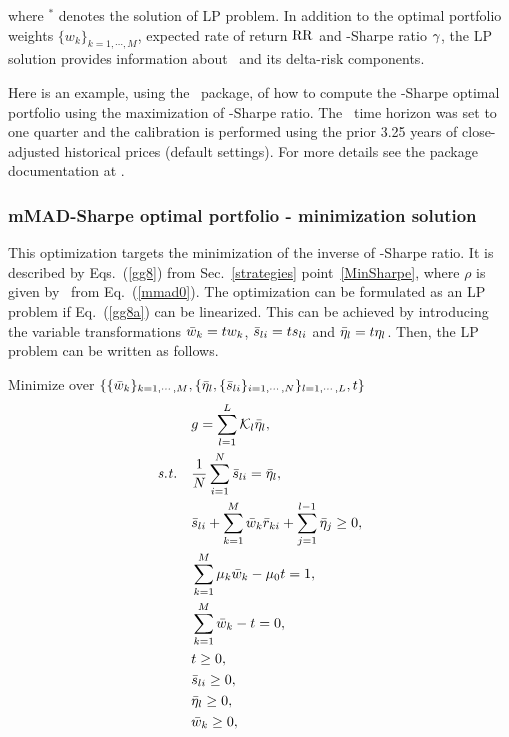 \noindent where $^*$ denotes the solution of LP problem.
In addition to the optimal portfolio weights $\{w_k\}_{k=1,\cdots,M}$, expected rate of return ${\rm RR}$ and
\mMAD-Sharpe ratio ${\gamma}$,
the LP solution provides information about \mMAD\ and its delta-risk components.

\bigskip
\noindent Here is an example, using the \azapy\ package, of how to compute the \mMAD-Sharpe optimal portfolio using the maximization
of \mMAD-Sharpe ratio.
The \mMAD\ time horizon was set to one quarter and the calibration is performed using the prior 3.25 years of
close-adjusted historical prices (default settings).
For more details see the package documentation at \azapydoc.



\BackToContents


\subsubsection{mMAD-Sharpe optimal portfolio - minimization solution}
This optimization targets the minimization of the inverse of \mMAD-Sharpe ratio.
It is described by Eqs.~(\ref{gg8}) from Sec.~\ref{strategies} point~\ref{MinSharpe}, where
$\rho$ is given by \mMAD\ from Eq.~(\ref{mmad0}).
The optimization can be formulated as an LP problem if Eq.~(\ref{gg8a}) can be linearized. This can be achieved by
introducing the variable transformations
${\bar w}_k = t w_k$, ${\bar s}_{li} = t s_{li}$ and ${\bar \eta}_l = t \eta_l$.
Then, the LP problem can be written as follows.

\bigskip
\noindent Minimize over $\{ \{{\bar w}_k\}_{k=1,\cdots,M}, \{ {\bar \eta}_l, \{ {\bar s}_{li} \}_{i=1,\cdots,N} \}_{l=1,\cdots,L}, t \}$
\begin{subequations}\label{mmad10}
\begin{align}
    &g = \sum_{l=1}^L \cK_l \bbeta_l, \label{mmad10a} \\
    \st &\frac{1}{N} \sum_{i=1}^N \bs_{li} = \bbeta_l, \label{mmad10b} \\
        &\bs_{li} + \sum_{k=1}^M \bw_k \br_{ki} + \sum_{j=1}^{l-1} \bbeta_j \geq 0, \label{mmad10c} \\
        &\sum_{k=1}^M \mu_k \bw_k -\mu_0 t = 1, \label{mmad10d} \\
        &\sum_{k=1}^M \bw_k - t = 0, \label{mmad10e} \\
        & t \geq 0, \label{mmad10h} \\
        &\bs_{li} \geq 0, \label{mmad10f} \\
        &\bbeta_l \geq 0, \label{mmad10i} \\
        &\bw_k \geq 0, \label{mmad10g}
\end{align}
\end{subequations}

